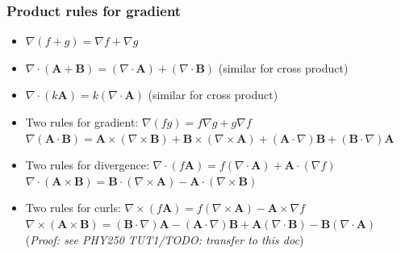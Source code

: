\documentclass[12pt,a4paper,twoside]{article}
\begin{document}
	\subsubsection{Product rules for gradient}
	\begin{itemize}
		\item \(\nabla (f+g)=\nabla f+\nabla g\)
		\item \(\nabla\cdot(\textbf{A}+\textbf{B})=(\nabla\cdot \textbf{A})+(\nabla \cdot \textbf{B})\) (similar for cross product)
		\item \(\nabla\cdot  (k\textbf{A})=k(\nabla\cdot \textbf{A})\) (similar for cross product)
		\item Two rules for gradient:
		\subitem \(\nabla(fg)=f\nabla g+g\nabla f\)
		\subitem \(\nabla(\textbf{A}\cdot \textbf{B})=\textbf{A}\times (\nabla \times \textbf{B})+\textbf{B}\times (\nabla \times \textbf{A})+(\textbf{A}\cdot \nabla)\textbf{B}+(\textbf{B}\cdot \nabla)\textbf{A}\)
		\item Two rules for divergence:
		\subitem \(\nabla \cdot (f\textbf{A})=f(\nabla \cdot \textbf{A})+\textbf{A}\cdot (\nabla f)\)
		\subitem \(\nabla \cdot (\textbf{A}\times \textbf{B})=\textbf{B}\cdot(\nabla \times \textbf{A})-\textbf{A}\cdot (\nabla\times \textbf{B})\)
		\item Two rules for curls:
		\subitem \(\nabla \times (f\textbf{A})=f(\nabla \times \textbf{A})-\textbf{A}\times \nabla f\)
		\subitem \(\nabla \times(\textbf{A}\times \textbf{B})=(\textbf{B}\cdot \nabla)\textbf{A}-(\textbf{A}\cdot \nabla)\textbf{B}+\textbf{A}(\nabla \cdot \textbf{B})-\textbf{B}(\nabla\cdot \textbf{A})\) (\textit{Proof: see PHY250 TUT1/TODO: transfer to this doc})
	\end{itemize}
	
\end{document}
